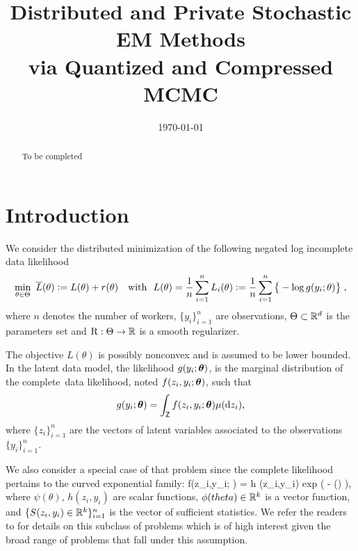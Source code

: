 \documentclass[11pt]{article}
\theoremstyle{t}
\begin{document}
\title{Distributed and Private Stochastic EM Methods\\
via Quantized and Compressed MCMC}
\date{\today}

\maketitle

\begin{abstract}
To be completed
\end{abstract}


\section{Introduction}

We consider the distributed minimization of the following negated log incomplete data likelihood 
\begin{align} \label{eq:em_motivate}
\begin{split} 
 \min_{ \theta \in \Theta }~ \overline{L} ( \theta ) \mathrel{\mathop:}=  L ( \theta ) + r (\theta) \quad \text{with}~~L(\theta) = \frac{1}{n} \sum_{i=1}^n L_i( \theta) \mathrel{\mathop:}=  \frac{1}{n} \sum_{i=1}^n \big\{ - \log g( y_i ; \theta ) \big\}\;,
\end{split} 
\end{align}
where $n$ denotes the number of workers, $\{y_i\}_{i=1}^n$ are observations, $\Theta \subset \mathbb{R}^d$ is the parameters set and $\operatorname{R} : \Theta \rightarrow \mathbb{R}$ is a smooth regularizer.

The objective  $L( \theta )$ is possibly {nonconvex} and is assumed to be lower bounded. 
In the latent data model, the likelihood $g(y_i ; {\bm{\theta}})$, is the marginal distribution of the complete~data likelihood, noted $f(z_i,y_i; {\bm{\theta}})$, such that 
\begin{align}
g(y_i; {\bm{\theta}}) = \int_{\mathsf{Z}} f (z_i,y_i;{\bm{\theta}}) \mu(\mathrm d z_i),    
\end{align}
where $\{ z_i \}_{i=1}^n$ are the vectors of latent variables associated to the observations $\{y_i\}_{i=1}^n$.

We also consider a special case of that problem since the complete likelihood pertains to the curved exponential family:
\beq \label{eq:exp}
f(z_i,y_i; \theta) = h  (z_i,y_i) \textrm{exp} (  - \psi(\theta) )\eqs,
\eeq
where $\psi(\theta)$, $h(z_i,y_i)$ are scalar functions, $\phi(theta) \in \mathbb{R}^k$ is a vector function, and $\{S(z_i,y_i) \in \mathbb{R}^k\}_{i=1}^n$ is the vector of sufficient statistics.
We refer the readers to \citep{efron1975defining} for details on this subclass of problems which is of high interest given the broad range of problems that fall under this assumption.
\end{document}
